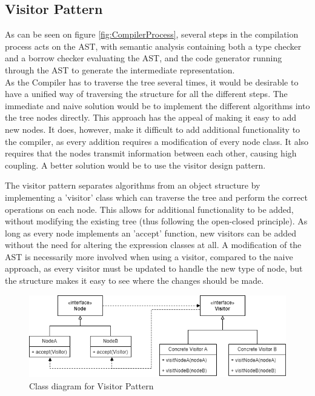 \subsection{Visitor Pattern}
\label{sec:VisitorDesign}

As can be seen on figure \ref{fig:CompilerProcess}, several steps in the compilation process acts on the AST, with semantic analysis containing both a type checker and a borrow checker evaluating the AST, and the code generator running through the AST to generate the intermediate representation.\\
As the Compiler has to traverse the tree several times, it would be desirable to have a unified way of traversing the structure for all the different steps. The immediate and naive solution would be to implement the different algorithms into the tree nodes directly. This approach has the appeal of making it easy to add new nodes. It does, however, make it difficult to add additional functionality to the compiler, as every addition requires a modification of every node class. It also requires that the nodes transmit information between each other, causing high coupling. A better solution would be to use the visitor design pattern.

The visitor pattern separates algorithms from an object structure by implementing a 'visitor' class which can traverse the tree and perform the correct operations on each node. This allows for additional functionality to be added, without modifying the existing tree (thus following the open-closed principle). As long as every node implements an 'accept' function, new visitors can be added without the need for altering the expression classes at all. A modification of the AST is necessarily more involved when using a visitor, compared to the naive approach, as every visitor must be updated to handle the new type of node, but the structure makes it easy to see where the changes should be made. 

\begin{figure}[h]
\includegraphics[width=\textwidth]{02-Body/Images/VisitorClassDiag.png}
\caption{Class diagram for Visitor Pattern}
\label{fig:VisitorClassDiagram}
\end{figure}

